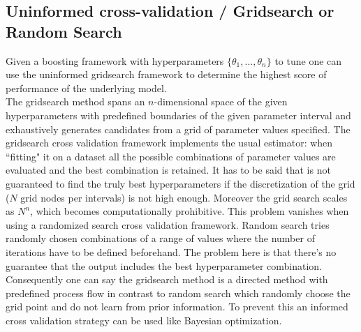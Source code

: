 \documentclass[12pt, a4paper]{article}
\begin{document}
\subsection{Uninformed cross-validation / Gridsearch or Random Search}
Given a boosting framework with hyperparameters $\{\theta_1,...,\theta_n\}$ to tune one can use the uninformed gridsearch framework to determine the highest score of performance of the underlying model. \\
The gridsearch method spans an $n$-dimensional space of the given hyperparameters with predefined boundaries of the given parameter interval and exhaustively generates candidates from a grid of parameter values specified.
The gridsearch cross validation framework implements the usual estimator: when ``fitting" it on a dataset all the possible combinations of parameter values are evaluated and the best combination is retained. It has to be said that is not guaranteed to find the truly best hyperparameters if the discretization of the grid ($N$ grid nodes per intervals) is not high enough. Moreover the grid search scales as $N^n$, which becomes computationally prohibitive. This problem vanishes when using a randomized search cross validation framework. Random search tries randomly chosen combinations of a range of values where the number of iterations have to be defined beforehand. The problem here is that there's no guarantee that the output includes the best hyperparameter combination. Consequently one can say the gridsearch method is a directed method with predefined process flow in contrast to random search which randomly choose the grid point and do not learn from prior information. To prevent this an informed cross validation strategy can be used like Bayesian optimization.
\end{document}
